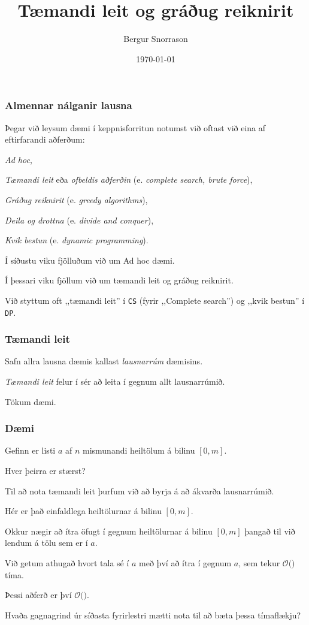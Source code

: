 

\title{Tæmandi leit og gráðug reiknirit}
\author{Bergur Snorrason}
\date{\today}



\frame{\titlepage}

{
	\frametitle{Almennar nálganir lausna}
	{
		\item<1-> Þegar við leysum dæmi í keppnisforritun notumst við oftast við eina af eftirfarandi aðferðum:
		{
			\item<2-> \emph{Ad hoc},
			\item<3-> \emph{Tæmandi leit} eða \emph{ofbeldis aðferðin} (e. \emph{complete search, brute force}),
			\item<4-> \emph{Gráðug reiknirit} (e. \emph{greedy algorithms}),
			\item<5-> \emph{Deila og drottna} (e. \emph{divide and conquer}),
			\item<6-> \emph{Kvik bestun} (e. \emph{dynamic programming}).
		}
		\item<7-> Í síðustu viku fjölluðum við um Ad hoc dæmi.
		\item<8-> Í þessari viku fjöllum við um tæmandi leit og gráðug reiknirit.
		\item<9-> Við styttum oft ,,tæmandi leit'' í \texttt{CS} (fyrir ,,Complete search'') og ,,kvik bestun'' í \texttt{DP}.
	}
}

{
	\frametitle{Tæmandi leit}
	{
		\item<1-> Safn allra lausna dæmis kallast \emph{lausnarrúm} dæmisins.
		\item<2-> \emph{Tæmandi leit} felur í sér að leita í gegnum allt lausnarrúmið.
		\item<3-> Tökum dæmi.
	}
}

{
	\frametitle{Dæmi}
	{
		\item<1-> Gefinn er listi $a$ af $n$ mismunandi heiltölum á bilinu $[0, m]$.
		\item<2-> Hver þeirra er stærst?
		\item<3-> Til að nota tæmandi leit þurfum við að byrja á að ákvarða lausnarrúmið.
		\item<4-> Hér er það einfaldlega heiltölurnar á bilinu $[0, m]$.
		\item<5-> Okkur nægir að ítra öfugt í gegnum heiltölurnar á bilinu $[0, m]$ þangað til við lendum á tölu sem er í $a$.
		\item<6-> Við getum athugað hvort tala sé í $a$ með því að ítra í gegnum $a$, sem tekur $\mathcal{O}($$)$ tíma.
		\item<8-> Þessi aðferð er því $\mathcal{O}($\onslide<9->{$nm$}$)$.
		\item<10-> Hvaða gagnagrind úr síðasta fyrirlestri mætti nota til að bæta þessa tímaflækju?
	}
}

